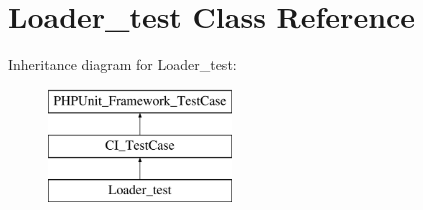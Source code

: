 \hypertarget{class_loader__test}{}\section{Loader\+\_\+test Class Reference}
\label{class_loader__test}
Inheritance diagram for Loader\+\_\+test\+:\begin{figure}[H]
\begin{center}
\leavevmode
\includegraphics[height=3.000000cm]{class_loader__test}
\end{center}
\end{figure}
